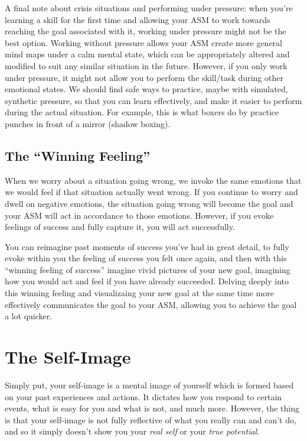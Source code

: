 \documentclass[
]{book}
\begin{document}
A final note about crisis situations and performing under pressure: when you're learning a skill for the first time and allowing your ASM to work towards reaching the goal associated with it, working under pressure might not be the best option. Working without pressure allows your ASM create more general mind maps under a calm mental state, which can be appropriately altered and modified to suit any similar situation in the future. However, if you only work under pressure, it might not allow you to perform the skill/task during other emotional states. We should find safe ways to practice, maybe with simulated, synthetic pressure, so that you can learn effectively, and make it easier to perform during the actual situation. For example, this is what boxers do by practice punches in front of a mirror (shadow boxing).

\hypertarget{the-winning-feeling}{%
\section{The ``Winning Feeling''}\label{the-winning-feeling}}

When we worry about a situation going wrong, we invoke the same emotions that we would feel if that situation actually went wrong. If you continue to worry and dwell on negative emotions, the situation going wrong will become the goal and your ASM will act in accordance to those emotions. However, if you evoke feelings of success and fully capture it, you will act successfully.

You can reimagine past moments of success you've had in great detail, to fully evoke within you the feeling of success you felt once again, and then with this ``winning feeling of success'' imagine vivid pictures of your new goal, imagining how you would act and feel if you have already succeeded. Delving deeply into this winning feeling and visualizaing your new goal at the same time more effectively communicates the goal to your ASM, allowing you to achieve the goal a lot quicker.

\hypertarget{the-self-image}{%
\chapter{The Self-Image}\label{the-self-image}}

Simply put, your self-image is a mental image of yourself which is formed based on your past experiences and actions. It dictates how you respond to certain events, what is easy for you and what is not, and much more. However, the thing is that your self-image is not fully reflective of what you really can and can't do, and so it simply doesn't show you your \emph{real self} or your \emph{true potential}.
\end{document}
